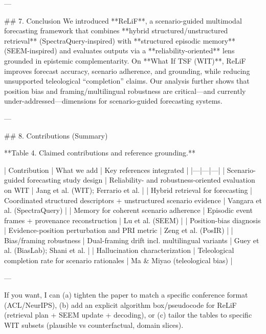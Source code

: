 ---

## 7. Conclusion  
We introduced **ReLiF**, a scenario-guided multimodal forecasting framework that combines **hybrid structured/unstructured retrieval** (SpectraQuery-inspired) with **structured episodic memory** (SEEM-inspired) and evaluates outputs via a **reliability-oriented** lens grounded in epistemic complementarity. On **What If TSF (WIT)**, ReLiF improves forecast accuracy, scenario adherence, and grounding, while reducing unsupported teleological “completion” claims. Our analysis further shows that position bias and framing/multilingual robustness are critical—and currently under-addressed—dimensions for scenario-guided forecasting systems.

---

## 8. Contributions (Summary)  

**Table 4. Claimed contributions and reference grounding.**

| Contribution | What we add | Key references integrated |
|---|---|---|
| Scenario-guided forecasting study design | Reliability- and robustness-oriented evaluation on WIT | Jang et al. (WIT); Ferrario et al. |
| Hybrid retrieval for forecasting | Coordinated structured descriptors + unstructured scenario evidence | Vangara et al. (SpectraQuery) |
| Memory for coherent scenario adherence | Episodic event frames + provenance reconstruction | Lu et al. (SEEM) |
| Position-bias diagnosis | Evidence-position perturbation and PRI metric | Zeng et al. (PosIR) |
| Bias/framing robustness | Dual-framing drift incl. multilingual variants | Guey et al. (BiasLab); Shani et al. |
| Hallucination characterization | Teleological completion rate for scenario rationales | Ma & Miyao (teleological bias) |

--- 

If you want, I can (a) tighten the paper to match a specific conference format (ACL/NeurIPS), (b) add an explicit algorithm box/pseudocode for ReLiF (retrieval plan + SEEM update + decoding), or (c) tailor the tables to specific WIT subsets (plausible vs counterfactual, domain slices).